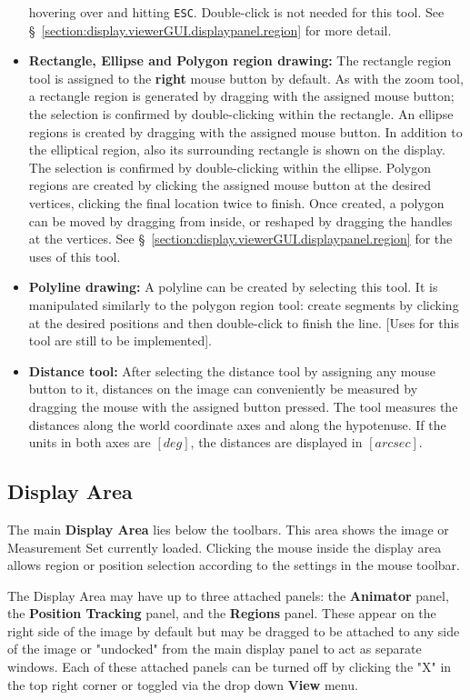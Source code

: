 \begin{itemize}
     hovering over and hitting {\tt ESC}.  Double-click is not needed
     for this tool.  See
     \S~\ref{section:display.viewerGUI.displaypanel.region} for more
     detail.
   \item {\bf Rectangle, Ellipse and Polygon region drawing:} The rectangle
     region tool is assigned to the {\bf right} mouse button by default.
     As with the zoom tool, a rectangle region is generated by dragging with
     the assigned mouse button; the selection is confirmed by double-clicking
     within the rectangle.
     An ellipse regions is created by dragging with the assigned mouse button.
     In addition to the elliptical region, also its surrounding rectangle is
     shown on the display. The selection is confirmed by double-clicking within
     the ellipse.
     Polygon regions are created by clicking the assigned mouse button
     at the desired vertices, clicking the final location twice to finish.
     Once created, a polygon can be moved by dragging from inside, or
     reshaped by dragging the handles at the vertices. 
     See \S~\ref{section:display.viewerGUI.displaypanel.region} for the uses
     of this tool.
   \item {\bf Polyline drawing:}
     A polyline can be created by selecting this tool. It is manipulated
     similarly to the polygon region tool: create segments by clicking at
     the desired positions and then double-click to finish the line.
     [Uses for this tool are still to be implemented].
   \item {\bf Distance tool:}
     After selecting the distance tool by assigning any mouse button to it,
     distances on the image can conveniently be measured by dragging the
     mouse with the assigned button pressed. The tool measures the distances
     along the world coordinate axes and along the hypotenuse. If the units
     in both axes are $[deg]$, the distances are displayed in $[arcsec]$.
\end{itemize}

\subsection{Display Area}

The main {\bf Display Area} lies below the toolbars. This area shows
the image or Measurement Set currently loaded. Clicking the mouse inside
the display area allows region or position selection according to the settings
in the mouse toolbar.

The Display Area may have up to three attached panels: the {\bf
  Animator} panel, the {\bf Position Tracking} panel, and the {\bf
  Regions} panel. These appear on the right side of the image by
default but may be dragged to be attached to any side of the image or
"undocked" from the main display panel to act as separate
windows. Each of these attached panels can be turned off by clicking
the "X" in the top right corner or toggled via the drop down {\bf
  View} menu.

